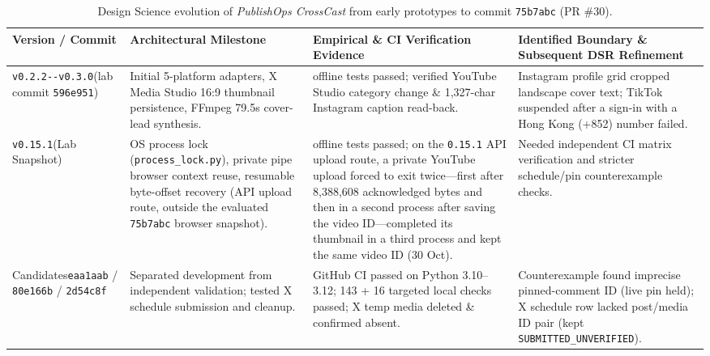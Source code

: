 \documentclass[11pt,a4paper]{article}
\theoremstyle{definition}
\begin{document}
\begin{table}[htbp]
\centering
\caption{Design Science evolution of \emph{PublishOps CrossCast} from early prototypes to commit \texttt{75b7abc} (PR \#30).}
\label{tab:5}
\scriptsize
\setlength{\tabcolsep}{3pt}
\begin{tabular}{>{\raggedright\hspace{0pt}\arraybackslash}p{}>{\raggedright\hspace{0pt}\arraybackslash}p{}>{\raggedright\hspace{0pt}\arraybackslash}p{}>{\raggedright\hspace{0pt}\arraybackslash}p{}}
\toprule
\textbf{Version / Commit} & \textbf{Architectural Milestone} & \textbf{Empirical \& CI Verification Evidence} & \textbf{Identified Boundary \& Subsequent DSR Refinement} \\
\midrule
\texttt{v0.2.2-{}-v0.3.0}\newline (lab commit \texttt{596e951}) & Initial 5-platform adapters, X Media Studio 16:9 thumbnail persistence, FFmpeg 79.5s cover-lead synthesis. & 86 offline tests passed; verified YouTube Studio category change \& 1,327-char Instagram caption read-back. & Instagram profile grid cropped landscape cover text; TikTok suspended after a sign-in with a Hong Kong (+852) number failed. \\
\texttt{v0.15.1}\newline (Lab Snapshot) & OS process lock (\texttt{process\_\allowbreak{}lock.\allowbreak{}py}), private pipe browser context reuse, resumable byte-offset recovery (API upload route, outside the evaluated \texttt{75b7abc} browser snapshot). & 417 offline tests passed; on the \texttt{0.15.1} API upload route, a private YouTube upload forced to exit twice---first after 8,388,608 acknowledged bytes and then in a second process after saving the video ID---completed its thumbnail in a third process and kept the same video ID (30 Oct). & Needed independent CI matrix verification and stricter schedule/pin counterexample checks. \\
Candidates\newline \texttt{eaa1aab} / \texttt{80e166b} / \texttt{2d54c8f} & Separated development from independent validation; tested X schedule submission and cleanup. & GitHub CI passed on Python 3.10--3.12; 143 + 16 targeted local checks passed; X temp media deleted \& confirmed absent. & Counterexample found imprecise pinned-comment ID (live pin held); X schedule row lacked post/media ID pair (kept \texttt{SUBMITTED\_\allowbreak{}UNVERIFIED}). \\

\end{tabular}
\end{table}
\end{document}

